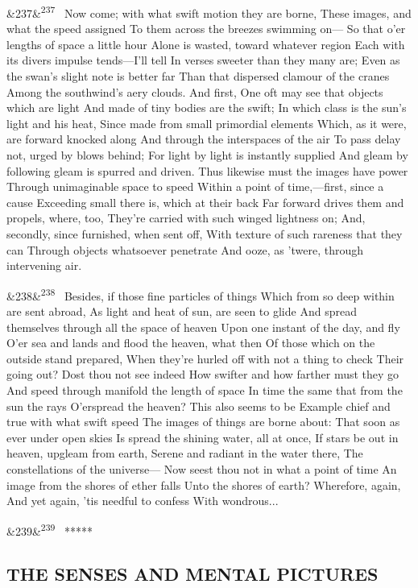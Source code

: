 \documentclass[12pt]{article}
\newcommand{\para}[1][]{\par\noindent\ifx&#1&\else\textsuperscript{\footnotesize #1}~\fi}
\begin{document}
\para[237] Now come; with what swift motion they are borne, These images, and what the speed assigned To them across the breezes swimming on--- So that o'er lengths of space a little hour Alone is wasted, toward whatever region Each with its divers impulse tends---I'll tell In verses sweeter than they many are; Even as the swan's slight note is better far Than that dispersed clamour of the cranes Among the southwind's aery clouds. And first, One oft may see that objects which are light And made of tiny bodies are the swift; In which class is the sun's light and his heat, Since made from small primordial elements Which, as it were, are forward knocked along And through the interspaces of the air To pass delay not, urged by blows behind; For light by light is instantly supplied And gleam by following gleam is spurred and driven. Thus likewise must the images have power Through unimaginable space to speed Within a point of time,---first, since a cause Exceeding small there is, which at their back Far forward drives them and propels, where, too, They're carried with such winged lightness on; And, secondly, since furnished, when sent off, With texture of such rareness that they can Through objects whatsoever penetrate And ooze, as 'twere, through intervening air.

\para[238] Besides, if those fine particles of things Which from so deep within are sent abroad, As light and heat of sun, are seen to glide And spread themselves through all the space of heaven Upon one instant of the day, and fly O'er sea and lands and flood the heaven, what then Of those which on the outside stand prepared, When they're hurled off with not a thing to check Their going out? Dost thou not see indeed How swifter and how farther must they go And speed through manifold the length of space In time the same that from the sun the rays O'erspread the heaven? This also seems to be Example chief and true with what swift speed The images of things are borne about: That soon as ever under open skies Is spread the shining water, all at once, If stars be out in heaven, upgleam from earth, Serene and radiant in the water there, The constellations of the universe--- Now seest thou not in what a point of time An image from the shores of ether falls Unto the shores of earth? Wherefore, again, And yet again, 'tis needful to confess With wondrous...

\para[239] *****

\subsection*{THE SENSES AND MENTAL PICTURES}
\end{document}
